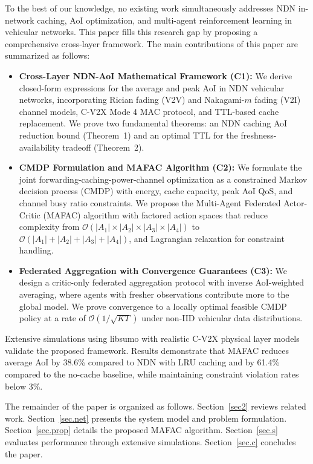 \documentclass[journal]{IEEEtran}
\begin{document}
To the best of our knowledge, no existing work simultaneously addresses NDN in-network caching, AoI optimization, and multi-agent reinforcement learning in vehicular networks. This paper fills this research gap by proposing a comprehensive cross-layer framework. The main contributions of this paper are summarized as follows:

\begin{itemize}
\item \textbf{Cross-Layer NDN-AoI Mathematical Framework (C1):} We derive closed-form expressions for the average and peak AoI in NDN vehicular networks, incorporating Rician fading (V2V) and Nakagami-$m$ fading (V2I) channel models, C-V2X Mode 4 MAC protocol, and TTL-based cache replacement. We prove two fundamental theorems: an NDN caching AoI reduction bound (Theorem~1) and an optimal TTL for the freshness-availability tradeoff (Theorem~2).

\item \textbf{CMDP Formulation and MAFAC Algorithm (C2):} We formulate the joint forwarding-caching-power-channel optimization as a constrained Markov decision process (CMDP) with energy, cache capacity, peak AoI QoS, and channel busy ratio constraints. We propose the Multi-Agent Federated Actor-Critic (MAFAC) algorithm with factored action spaces that reduce complexity from $\mathcal{O}(|A_1| \times |A_2| \times |A_3| \times |A_4|)$ to $\mathcal{O}(|A_1| + |A_2| + |A_3| + |A_4|)$, and Lagrangian relaxation for constraint handling.

\item \textbf{Federated Aggregation with Convergence Guarantees (C3):} We design a critic-only federated aggregation protocol with inverse AoI-weighted averaging, where agents with fresher observations contribute more to the global model. We prove convergence to a locally optimal feasible CMDP policy at a rate of $\mathcal{O}(1/\sqrt{KT})$ under non-IID vehicular data distributions.
\end{itemize}

Extensive simulations using libsumo with realistic C-V2X physical layer models validate the proposed framework. Results demonstrate that MAFAC reduces average AoI by 38.6\% compared to NDN with LRU caching and by 61.4\% compared to the no-cache baseline, while maintaining constraint violation rates below 3\%.

The remainder of the paper is organized as follows. Section~\ref{sec2} reviews related work. Section~\ref{sec.net} presents the system model and problem formulation. Section~\ref{sec.prop} details the proposed MAFAC algorithm. Section~\ref{sec.s} evaluates performance through extensive simulations. Section~\ref{sec.c} concludes the paper.
\end{document}

